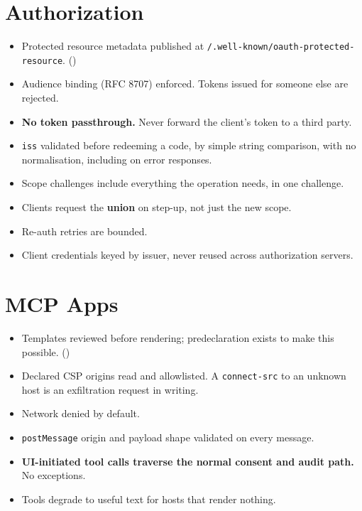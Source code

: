 \section{Authorization}

\begin{itemize}[leftmargin=1.6em, itemsep=3pt]
\item[$\square$] Protected resource metadata published at
\texttt{/.well-known/\allowbreak oauth-protected-\allowbreak resource}.
()
\item[$\square$] Audience binding (RFC 8707) enforced. Tokens issued for someone
else are rejected.
\item[$\square$] \textbf{No token passthrough.} Never forward the client's token
to a third party.
\item[$\square$] \texttt{iss} validated before redeeming a code, by simple string
comparison, with no normalisation, including on error responses.
\item[$\square$] Scope challenges include everything the operation needs, in one
challenge.
\item[$\square$] Clients request the \textbf{union} on step-up, not just the new
scope.
\item[$\square$] Re-auth retries are bounded.
\item[$\square$] Client credentials keyed by issuer, never reused across
authorization servers.
\end{itemize}

\section{MCP Apps}

\begin{itemize}[leftmargin=1.6em, itemsep=3pt]
\item[$\square$] Templates reviewed before rendering; predeclaration exists to
make this possible. ()
\item[$\square$] Declared CSP origins read and allowlisted. A \texttt{connect-src}
to an unknown host is an exfiltration request in writing.
\item[$\square$] Network denied by default.
\item[$\square$] \texttt{postMessage} origin and payload shape validated on every
message.
\item[$\square$] \textbf{UI-initiated tool calls traverse the normal consent and
audit path.} No exceptions.
\item[$\square$] Tools degrade to useful text for hosts that render nothing.
\end{itemize}

